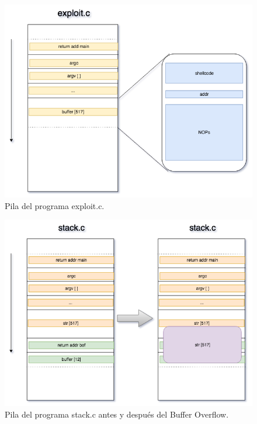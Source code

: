 \documentclass[a4,12pt,onecolum]{article}
\begin{document}
\begin{figure}[htbp]
\centering
\includegraphics[width=1.0\textwidth]{./images/BOpilaexploit.png}
\caption{Pila del programa exploit.c.}
\label{fig:bo5}
\end{figure}




\begin{figure}[htbp]
\centering
\includegraphics[width=1.0\textwidth]{./images/BOpilastack.png}
\caption{Pila del programa stack.c antes y después del Buffer Overflow.}
\label{fig:bo6}
\end{figure}
\end{document}

